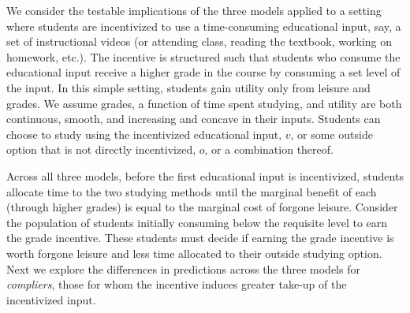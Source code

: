 \documentclass[12pt]{article}
\begin{document}
We consider the testable implications of the three models applied to a setting where students are incentivized to use a time-consuming educational input, say, a set of instructional videos (or attending class, reading the textbook, working on homework, etc.).
The incentive is structured such that students who consume the educational input receive a higher grade in the course by consuming a set level of the input.
In this simple setting, students gain utility only from leisure and grades.
We assume grades, a function of time spent studying, and utility are both continuous, smooth, and increasing and concave in their inputs.
Students can choose to study using the incentivized educational input, $v$, or some outside option that is not directly incentivized, $o$, or a combination thereof.

Across all three models, before the first educational input is incentivized, students allocate time to the two studying methods until the marginal benefit of each (through higher grades) is equal to the marginal cost of forgone leisure.
Consider the population of students initially consuming below the requisite level to earn the grade incentive.
These students must decide if earning the grade incentive is worth forgone leisure and less time allocated to their outside studying option.
Next we explore the differences in predictions across the three models for \textit{compliers}, those for whom the incentive induces greater take-up of the incentivized input.

\end{document}
